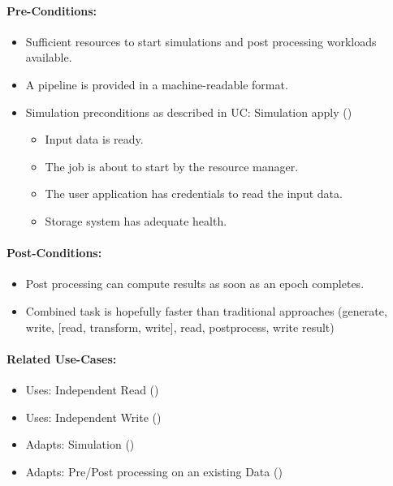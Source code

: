 \paragraph{Pre-Conditions:}
\begin{itemize}
	\item Sufficient resources to start simulations and post processing workloads available.
	\item A pipeline is provided in a machine-readable format.
	\item Simulation preconditions as described in UC: Simulation apply ()
	\begin{itemize}
		\item Input data is ready.
		\item The job is about to start by the resource manager.
		\item The user application has credentials to read the input data.
		\item Storage system has adequate health.
	\end{itemize}

\end{itemize}


\paragraph{Post-Conditions:}
\begin{itemize}
	\item Post processing can compute results as soon as an epoch completes.
	\item Combined task is hopefully faster than traditional approaches (generate, write, [read, transform, write], read, postprocess, write result)
\end{itemize}


\paragraph{Related Use-Cases:}
\begin{itemize}
	\item Uses: Independent Read ()
	\item Uses: Independent Write ()
	\item Adapts: Simulation ()
	\item Adapts: Pre/Post processing on an existing Data ()
\end{itemize}


